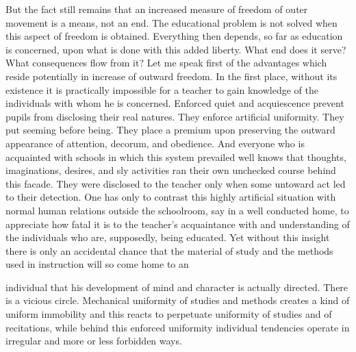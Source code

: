 But the fact still remains that an increased measure of freedom of outer movement is a 
means, not an end. The educational problem is not solved when this aspect of freedom is 
obtained. Everything then depends, so far as education is concerned, upon what is done 
with this added liberty. What end does it serve? What consequences flow from it? Let me 
speak first of the advantages which reside potentially in increase of outward freedom. In 
the first place, without its existence it is practically impossible for a teacher to gain 
knowledge of the individuals with whom he is concerned. Enforced quiet and 
acquiescence prevent pupils from disclosing their real natures. They enforce artificial 
uniformity. They put seeming before being. They place a premium upon preserving the 
outward appearance of attention, decorum, and obedience. And everyone who is 
acquainted with schools in which this system prevailed well knows that thoughts, 
imaginations, desires, and sly activities ran their own unchecked course behind this 
facade. They were disclosed to the teacher only when some untoward act led to their 
detection. One has only to contrast this highly artificial situation with normal human 
relations outside the schoolroom, say in a well conducted home, to appreciate how fatal it 
is to the teacher's acquaintance with and understanding of the individuals who are, 
supposedly, being educated. Yet without this insight there is only an accidental chance 
that the material of study and the methods used in instruction will so come home to an 


individual that his development of mind and character is actually directed. There is a 
vicious circle. Mechanical uniformity of studies and methods creates a kind of uniform 
immobility and this reacts to perpetuate uniformity of studies and of recitations, while 
behind this enforced uniformity individual tendencies operate in irregular and more or 
less forbidden ways. 

